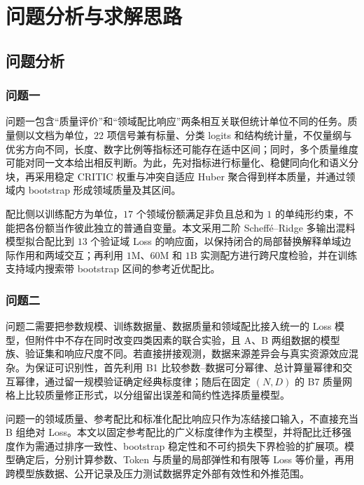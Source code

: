 \section{问题分析与求解思路}
\label{sec:overall_strategy}

\subsection{问题分析}

\subsubsection{问题一}

问题一包含“质量评价”和“领域配比响应”两条相互关联但统计单位不同的任务。质量侧以文档为单位，$22$ 项信号兼有标量、分类 logits 和结构统计量，不仅量纲与优劣方向不同，长度、数字比例等指标还可能存在适中区间；同时，多个质量维度可能对同一文本给出相反判断。为此，先对指标进行标量化、稳健同向化和语义分块，再采用稳定 CRITIC 权重与冲突自适应 Huber 聚合得到样本质量，并通过领域内 bootstrap 形成领域质量及其区间。

配比侧以训练配方为单位，$17$ 个领域份额满足非负且总和为 $1$ 的单纯形约束，不能把各份额当作彼此独立的普通自变量。本文采用二阶 Scheff\'e--Ridge 多输出混料模型拟合配比到 $13$ 个验证域 Loss 的响应面，以保持闭合的局部替换解释单域边际作用和两域交互；再利用 $1\mathrm{M}$、$60\mathrm{M}$ 和 $1\mathrm{B}$ 实测配方进行跨尺度检验，并在训练支持域内搜索带 bootstrap 区间的参考近优配比。

\subsubsection{问题二}

问题二需要把参数规模、训练数据量、数据质量和领域配比接入统一的 Loss 模型，但附件中不存在同时改变四类因素的联合实验，且 A、B 两组数据的模型族、验证集和响应尺度不同。若直接拼接观测，数据来源差异会与真实资源效应混杂。为保证可识别性，首先利用 B1 比较参数--数据可分幂律、总计算量幂律和交互幂律，通过留一规模验证确定经典标度律；随后在固定 $(N,D)$ 的 B7 质量网格上比较质量修正形式，以分组留出误差和简约性选择质量模型。

问题一的领域质量、参考配比和标准化配比响应只作为冻结接口输入，不直接充当 B 组绝对 Loss。本文以固定参考配比的广义标度律作为主模型，并将配比迁移强度作为需通过排序一致性、bootstrap 稳定性和不可约损失下界检验的扩展项。模型确定后，分别计算参数、Token 与质量的局部弹性和有限等 Loss 等价量，再用跨模型族数据、公开记录及压力测试数据界定外部有效性和外推范围。

